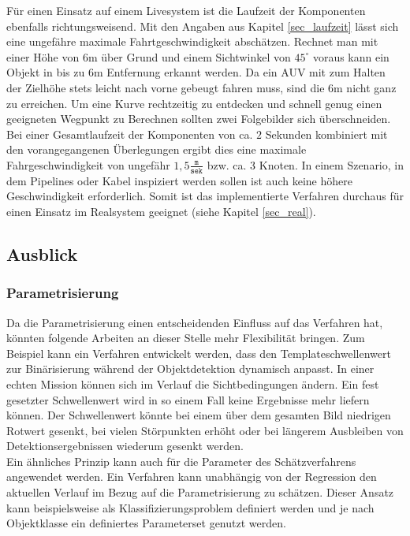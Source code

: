 Für einen Einsatz auf einem Livesystem ist die Laufzeit der Komponenten ebenfalls richtungsweisend. Mit den Angaben aus Kapitel \ref{sec_laufzeit} lässt sich eine ungefähre maximale Fahrtgeschwindigkeit abschätzen. Rechnet man mit einer Höhe von $6$m über Grund und einem Sichtwinkel von $45^\circ$ voraus kann ein Objekt in bis zu $6$m Entfernung erkannt werden. Da ein AUV mit zum Halten der Zielhöhe stets leicht nach vorne gebeugt fahren muss, sind die $6$m nicht ganz zu erreichen. Um eine Kurve rechtzeitig zu entdecken und schnell genug einen geeigneten Wegpunkt zu Berechnen sollten zwei Folgebilder sich überschneiden.\\
Bei einer Gesamtlaufzeit der Komponenten von ca. $2$ Sekunden kombiniert mit den vorangegangenen Überlegungen ergibt dies eine maximale Fahrgeschwindigkeit von ungefähr $1,5 \frac{\texttt{m}}{\texttt{sek}}$ bzw. ca. $3$ Knoten. In einem Szenario, in dem Pipelines oder Kabel inspiziert werden sollen ist auch keine höhere Geschwindigkeit erforderlich. Somit ist das implementierte Verfahren durchaus für einen Einsatz im Realsystem geeignet (siehe Kapitel \ref{sec_real}).

\subsection{Ausblick}

\subsubsection{Parametrisierung}
Da die Parametrisierung einen entscheidenden Einfluss auf das Verfahren hat, könnten folgende Arbeiten an dieser Stelle mehr Flexibilität bringen. Zum Beispiel kann ein Verfahren entwickelt werden, dass den Templateschwellenwert zur Binärisierung während der Objektdetektion dynamisch anpasst. In einer echten Mission können sich im Verlauf die Sichtbedingungen ändern. Ein fest gesetzter Schwellenwert wird in so einem Fall keine Ergebnisse mehr liefern können. Der Schwellenwert könnte bei einem über dem gesamten Bild niedrigen Rotwert gesenkt, bei vielen Störpunkten erhöht oder bei längerem Ausbleiben von Detektionsergebnissen wiederum gesenkt werden.\\

Ein ähnliches Prinzip kann auch für die Parameter des Schätzverfahrens angewendet werden. Ein Verfahren kann unabhängig von der Regression den aktuellen Verlauf im Bezug auf die Parametrisierung zu schätzen. Dieser Ansatz kann beispielsweise als Klassifizierungsproblem definiert werden und je nach Objektklasse ein definiertes Parameterset genutzt werden.

